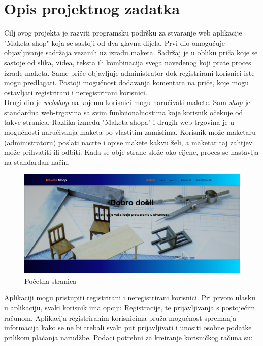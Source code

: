 \chapter{Opis projektnog zadatka}
		
		
		\indent Cilj ovog projekta je razviti programsku podršku za stvaranje web aplikacije "Maketa shop" koja se sastoji od dva glavna dijela. 
		\indent Prvi dio omogućuje objavljivanje sadržaja vezanih uz izradu maketa. Sadržaj je u obliku priča koje se sastoje od slika, videa, teksta ili kombinacija svega navedenog koji prate proces izrade maketa. Same priče objavljuje administrator dok registrirani korisnici iste mogu predlagati. Postoji mogućnost dodavanja komentara na priče, koje mogu ostavljati registrirani i neregistrirani korisnici. \\
		\indent Drugi dio je \textit{webshop} na kojemu korisnici mogu naručivati makete. Sam \textit{shop} je standardna web-trgovina sa svim funkcionalnostima koje korisnik očekuje od takve stranica. Razlika između "Maketa shopa" i drugih web-trgovina je u mogućnosti naručivanja maketa po vlastitim zamislima. Korisnik može maketaru (administratoru) poslati nacrte i opise makete kakvu želi, a maketar taj zahtjev može prihvatiti ili odbiti. Kada se obje strane slože oko cijene, proces se nastavlja na standardan način.
		
		\begin{figure}[H]
			\includegraphics[width=.9\linewidth]{slike/20201112_182209.png}
			\centering
			\caption{Početna stranica}
			\label{fig:opis1}
		\end{figure}
	
		Aplikaciji mogu pristupiti registrirani i neregistrirani korisnici. Pri prvom ulasku u aplikaciju, svaki korisnik ima opciju Registracije, te prijavljivanja s postojećim računom. Aplikacija registriranim korisnicima pruža mogućnost spremanja informacija kako se ne bi trebali svaki put prijavljivati i unositi osobne podatke prilikom plaćanja narudžbe. Podaci potrebni za kreiranje korisničkog računa su:
		
